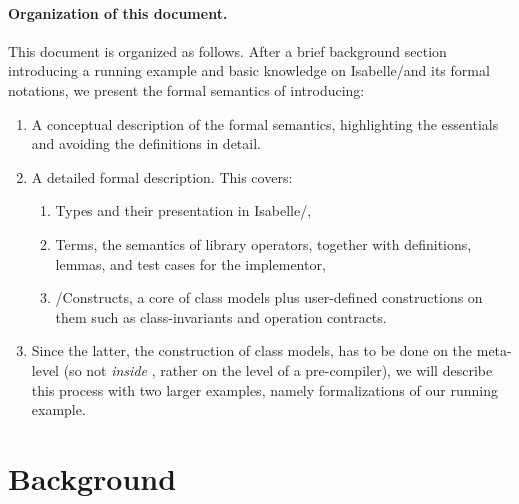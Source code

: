 \paragraph{Organization of this document.}
This document is organized as follows. After a brief background section
introducing a running example and basic knowledge on Isabelle/\HOL and its formal
notations, we present the formal semantics of  \FOCL introducing:
\begin{enumerate}
\item A conceptual description of the formal semantics, highlighting the essentials
      and avoiding the definitions in detail.
\item A detailed formal description. This covers:
\begin{enumerate}
\item \OCL Types and their presentation in Isabelle/\HOL,
\item \OCL Terms, \ie{} the semantics of library operators, 
        together with definitions, lemmas, and test cases for the implementor,
\item \UML/\OCL Constructs, \ie{} a core of \UML class models plus user-defined
        constructions on them such as class-invariants and operation contracts.
\end{enumerate}
\item Since the latter, \ie{} the construction of \UML class models, has to be done on the meta-level
(so not \emph{inside} \HOL, rather on the level of a pre-compiler), we will describe this process
with two larger examples, namely formalizations of our running example.
\end{enumerate}
       


\section{Background}
\isatagafp
